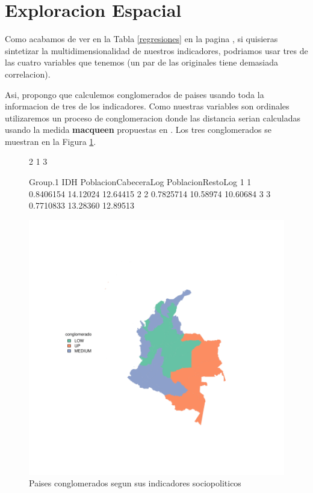 \documentclass{article}
\begin{document}
\clearpage


\section{Exploracion Espacial}

Como acabamos de ver en la Tabla \ref{regresiones} en la pagina \pageref{regresiones}, si quisieras sintetizar la multidimensionalidad de nuestros indicadores, podriamos usar tres de las cuatro variables que tenemos (un par de las originales tiene demasiada correlacion). 

Asi, propongo que calculemos conglomerados de paises usando toda la informacion de tres de los indicadores. Como nuestras variables son ordinales utilizaremos un proceso de conglomeracion donde las distancia serian calculadas usando la medida {\bf macqueen} propuestas en \cite{macqueen_methods_nodate}. Los tres conglomerados se muestran en la Figura \ref{clustmap}.




\begin{figure}[h]
\centering
\begin{Schunk}
\begin{Soutput}
[1] 2 1 3
\end{Soutput}
\begin{Soutput}
  Group.1       IDH PoblacionCabeceraLog PoblacionRestoLog
1       1 0.8406154             14.12024          12.64415
2       2 0.7825714             10.58974          10.60684
3       3 0.7710833             13.28360          12.89513
\end{Soutput}
\end{Schunk}
\includegraphics{Proyecto-plotMap1}
\caption{Paises conglomerados segun sus indicadores sociopoliticos}\label{clustmap}
\end{figure}



\renewcommand{\refname}{Bibliografia}

\end{document}

